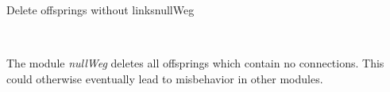 \begin{moduledoc}{Delete offsprings without links}{nullWeg}

  \item[\KeyWord{no parameter}]~\\
    

\end{moduledoc}
The module {\it nullWeg} deletes all offsprings which contain
no connections. This could otherwise eventually lead to
misbehavior in other modules.

